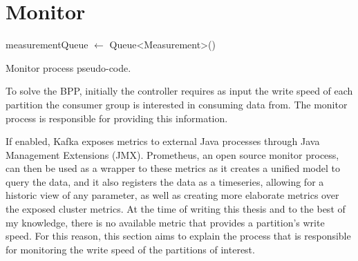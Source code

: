 \section{Monitor} \label{component:Monitor}

\IncMargin{1em} 
\begin{algorithm}[h]
    \BlankLine

    measurementQueue $\gets$ Queue<Measurement>()\; 
    \caption{Monitor process pseudo-code.}
\label{algo:monitor} \end{algorithm}\DecMargin{1em}

To solve the BPP, initially the controller requires as input the write speed of
each partition the consumer group is interested in consuming data from. The
monitor process is responsible for providing this information.

If enabled, Kafka exposes metrics to external Java processes through Java
Management Extensions (JMX). Prometheus, an open source monitor process, can
then be used as a wrapper to these metrics as it creates a unified model to
query the data, and it also registers the data as a timeseries, allowing for a
historic view of any parameter, as well as creating more elaborate metrics over
the exposed cluster metrics. At the time of writing this thesis and to the best
of my knowledge, there is no available metric that provides a partition's write
speed.  For this reason, this section aims to explain the process that is
responsible for monitoring the write speed of the partitions of interest.

